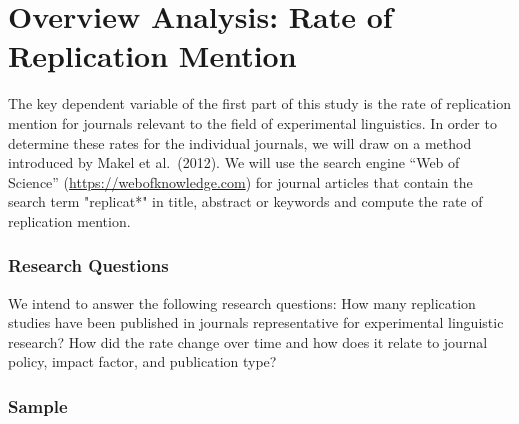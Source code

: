 \documentclass[
  english,
  man]{apa6}
\begin{document}
\hypertarget{overview-analysis-rate-of-replication-mention}{%
\section{Overview Analysis: Rate of Replication Mention}\label{overview-analysis-rate-of-replication-mention}}

The key dependent variable of the first part of this study is the rate of replication mention for journals relevant to the field of experimental linguistics.
In order to determine these rates for the individual journals, we will draw on a method introduced by Makel et al.~(2012).
We will use the search engine \enquote{Web of Science} (\url{https://webofknowledge.com}) for journal articles that contain the search term "replicat*" in title, abstract or keywords and compute the rate of replication mention.

\hypertarget{research-questions}{%
\subsubsection{Research Questions}\label{research-questions}}

We intend to answer the following research questions: How many replication studies have been published in journals representative for experimental linguistic research?
How did the rate change over time and how does it relate to journal policy, impact factor, and publication type?

\hypertarget{sample}{%
\subsubsection{Sample}\label{sample}}
\end{document}

